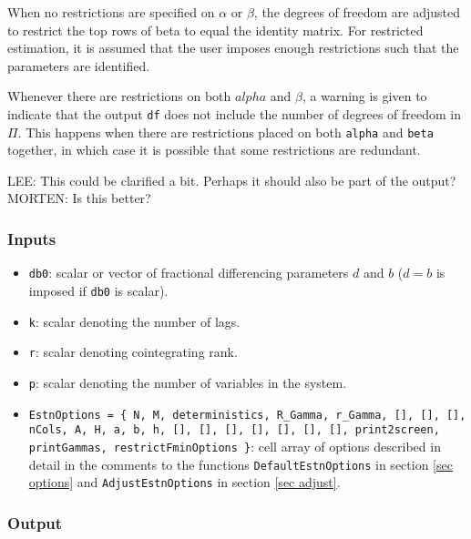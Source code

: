 \documentclass[12pt]{article}
\begin{document}
When no restrictions are specified on $\alpha$ or $\beta$, the degrees of freedom are adjusted to restrict the top rows of beta to equal the identity matrix. For restricted estimation, it is assumed that the user imposes enough restrictions such that the parameters are identified. 

Whenever there are restrictions on both $alpha$ and $\beta$, a warning is given to indicate that the output \texttt{df} does not include the number of degrees of freedom in $\Pi$.
This happens when there are restrictions placed on both \texttt{alpha} and \texttt{beta} together, in which case it is possible that some restrictions are redundant. 

LEE: This could be clarified a bit. Perhaps it should also be part of the output?
MORTEN: Is this better?

\subsubsection*{Inputs}

\begin{itemize}

\item \texttt{db0}: scalar or vector of fractional differencing parameters $d$ and $b$ ($d = b$ is imposed if \texttt{db0} is scalar).

\item \texttt{k}: scalar denoting the number of lags.

\item \texttt{r}: scalar denoting cointegrating rank.

\item \texttt{p}: scalar denoting the number of variables in the system.

\item \texttt{EstnOptions = \{ N, M, deterministics, R\_Gamma, r\_Gamma, [], [], [], nCols, A, H, a, b, h, [], [], [], [], [], [], [], print2screen, printGammas, restrictFminOptions \}}: cell array of options described in detail in the comments to the functions \texttt{DefaultEstnOptions} in section \ref{sec options} and \texttt{AdjustEstnOptions} in section \ref{sec adjust}. 

\end{itemize}

\subsubsection*{Output}
\end{document}
